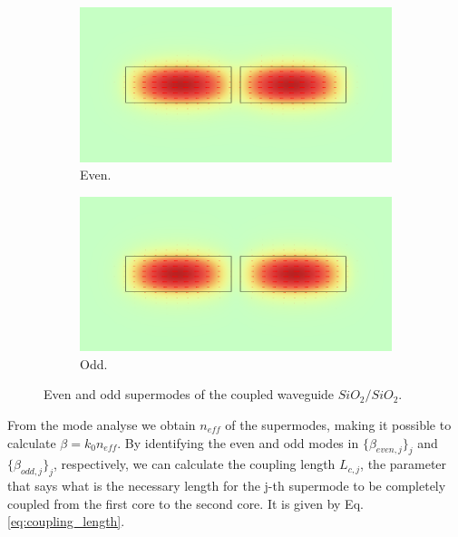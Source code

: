 \documentclass[a4paper,12pt]{article}
\begin{document}
\begin{figure}[H]
    \centering
    \begin{subfigure}{0.45\textwidth}
        \centering
        \includegraphics[scale=0.32]{SiO2_SiO2_normE_0_d0.5um.png}
        \caption{Even.}
        \label{fig:even_supermode}
    \end{subfigure}
    \hfill
    \begin{subfigure}{0.45\textwidth}
        \centering
        \includegraphics[scale=0.32]{SiO2_SiO2_normE_1_d0.5um.png}
        \caption{Odd.}
        \label{fig:odd_supermode}
    \end{subfigure}
    \caption{Even and odd supermodes of the coupled waveguide $SiO_2/SiO_2$.}
\end{figure}

From the mode analyse we obtain $n_{eff}$ of the supermodes, making it possible to calculate $\beta = k_0 n_{eff}$. By identifying the even and odd modes in $\{\beta_{even,j}\}_j$ and $\{\beta_{odd,j}\}_j$, respectively, we can calculate the coupling length $L_{c,j}$, the parameter that says what is the necessary length for the j-th supermode to be completely coupled from the first core to the second core. It is given by Eq. \eqref{eq:coupling_length}.
\end{document}
